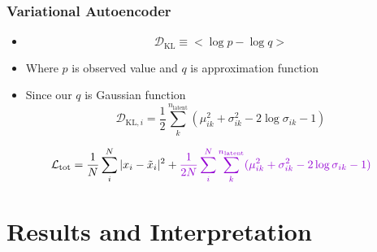 \documentclass{beamer}
\begin{document}
\begin{frame}
\frametitle{Variational Autoencoder}
\begin{theorem}
\begin{itemize}
    \small 
    \item {}
    \begin{equation}
        \mathcal{D}_{\text{KL}} \equiv < \log p - \log q >
    \end{equation}
    \item Where $p$ is observed value and $q$ is approximation function
    \item Since our $q$ is Gaussian function
    \begin{equation}
        \mathcal{D}_{\text{KL}, i} = \frac{1}{2}\sum_k^{n_{\text{latent}}}(\mu_{ik}^2 +\sigma_{ik}^2 - 2\log\sigma_{ik} - 1)
    \end{equation}
\end{itemize}
\end{theorem}
\begin{equation}
    \mathcal{L}_{\text{tot}} = \frac{1}{N}\sum_i^N |x_i-\tilde{x}_i|^2 + \textcolor[RGB]{148,0,211}{\frac{1}{2N}\sum_i^N\sum_k^{n_{\text{latent}}}(\mu_{ik}^2 +\sigma_{ik}^2 - 2\log\sigma_{ik} - 1)}
\end{equation}
\end{frame}

\section{Results and Interpretation}
\subsection{}
\end{document}
